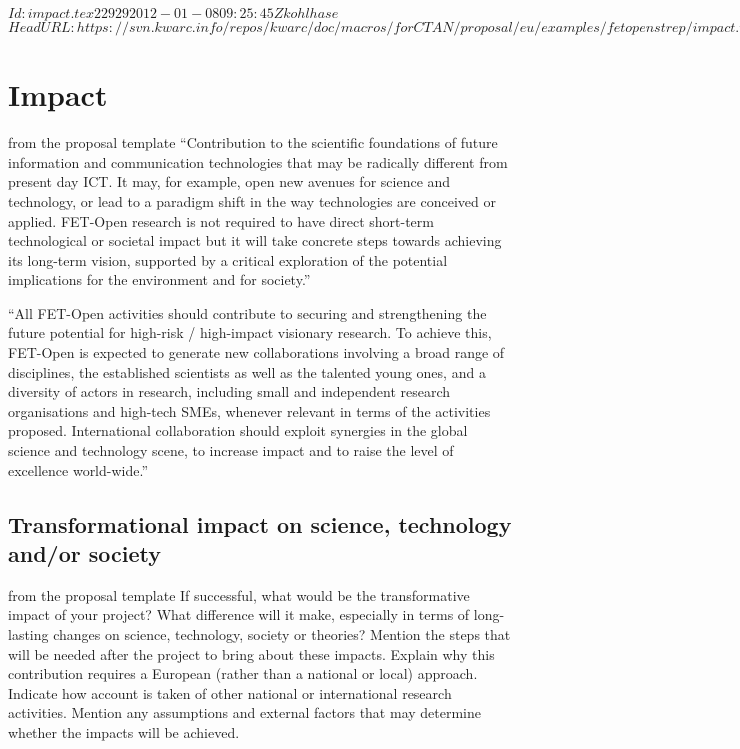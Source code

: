 \svnInfo $Id: impact.tex 22929 2012-01-08 09:25:45Z kohlhase $
\svnKeyword $HeadURL: https://svn.kwarc.info/repos/kwarc/doc/macros/forCTAN/proposal/eu/examples/fetopenstrep/impact.tex $
\chapter{Impact}\label{chap:impact}
\begin{todo}{from the proposal template}
``Contribution to the scientific foundations of future information and communication technologies that
may be radically different from present day ICT. It may, for example, open new avenues for science and
technology, or lead to a paradigm shift in the way technologies are conceived or applied. FET-Open research is not required to have direct short-term technological or societal impact but it will take concrete
steps towards achieving its long-term vision, supported by a critical exploration of the potential implications for the environment and for society.''

``All FET-Open activities should contribute to securing and strengthening the future potential for high-risk / high-impact visionary research. To achieve this, FET-Open is expected to generate new collaborations involving a broad range of disciplines, the established scientists as well as the talented young ones, and a diversity of actors in research, including small and independent research organisations and high-tech SMEs, whenever relevant in terms of the activities proposed. International collaboration should exploit synergies in the global science and technology scene, to increase impact and to raise the level of excellence world-wide.''
\end{todo}
\section{Transformational impact on science, technology and/or society}\label{sec:transformational-impact}
\begin{todo}{from the proposal template}
      If successful, what would be the transformative impact of your project? What difference will it make, especially in terms of long-lasting changes on science, technology, society or theories? Mention the steps that will be needed after the project to bring about these impacts. Explain why this contribution requires a European (rather than a national or local) approach. Indicate how account is taken of other national or international research activities. Mention any assumptions and external factors that may determine whether the impacts will be achieved.
\end{todo}
